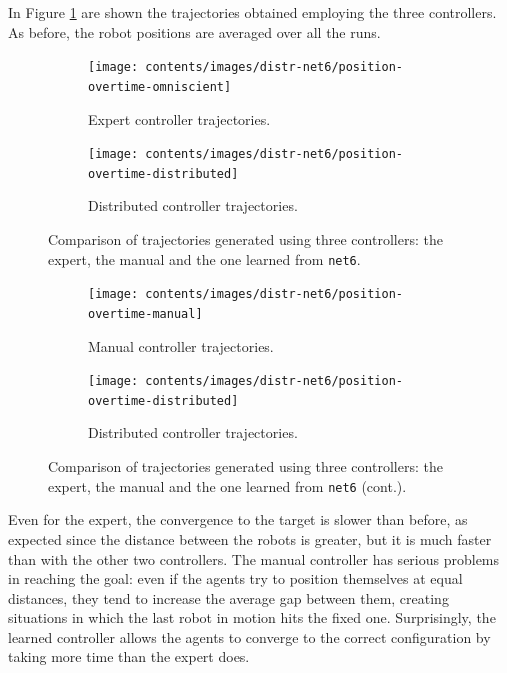 In Figure \ref{fig:net6traj} are shown the trajectories obtained employing the 
three controllers. 
As before, the robot positions are averaged over all the runs. 
\begin{figure}[!htb]
	\begin{center}
		\begin{subfigure}[h]{0.49\textwidth}
			\centering
			\texttt{[image: contents/images/distr-net6/position-overtime-omniscient]}%
			\caption{Expert controller trajectories.}
		\end{subfigure}
		\hfill
		\begin{subfigure}[h]{0.49\textwidth}
			\centering
			\texttt{[image: contents/images/distr-net6/position-overtime-distributed]}
			\caption{Distributed controller trajectories.}
		\end{subfigure}
	\end{center}
	\caption[Evaluation of the trajectories learned by 
	\texttt{net6}.]{Comparison of trajectories generated using three 
		controllers: the expert, the manual and the one learned from \texttt{net6}.}
\end{figure}
\medskip
\begin{figure}[!htb]\ContinuedFloat
	\centering
	\begin{subfigure}[h]{0.49\textwidth}
		\centering
		\texttt{[image: contents/images/distr-net6/position-overtime-manual]}%
		\caption{Manual controller trajectories.}
	\end{subfigure}
	\hfill
	\begin{subfigure}[h]{0.49\textwidth}
		\centering
		\texttt{[image: contents/images/distr-net6/position-overtime-distributed]}
		\caption{Distributed controller trajectories.}
	\end{subfigure}
	\caption[]{Comparison 
		of trajectories generated using three controllers: the expert, the manual 
		and the one learned from \texttt{net6} (cont.).}
	\label{fig:net6traj}
\end{figure}
\noindent
Even for the expert, the convergence to the target is slower than before, 
as expected since the distance between the robots is greater, but it is much faster 
than with the other two controllers.
The manual controller has serious problems in reaching the goal: even if the 
agents try to position themselves at equal distances, they tend to increase the 
average gap between them, creating situations in which the last robot in motion 
hits the fixed one. Surprisingly, the learned controller allows the agents to 
converge to the correct configuration by taking more time than the expert does.

